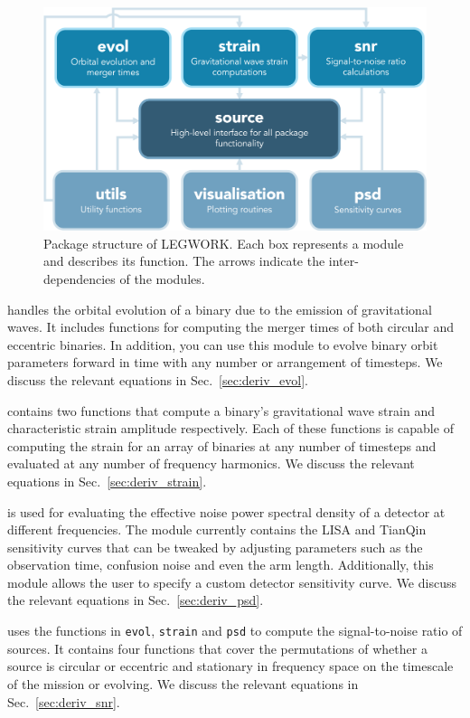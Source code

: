 \documentclass[twocolumn]{aastex631}
\newcommand{\lw}{LEGWORK}
\newcommand{\lwColour}{SeaGreen}
\newcommand{\lwModLink}[1]{\href{https://legwork.readthedocs.io/en/latest/modules.html\#module-legwork.#1}{\color{\lwColour}{\texttt{#1}}}}
\begin{document}
\begin{figure}
    \centering
    \includegraphics[width=\columnwidth]{static/package_overview.png}
    \caption{Package structure of \lw{}. Each box represents a module and describes its function. The arrows indicate the inter-dependencies of the modules.}
    \label{fig:package_overview}
\end{figure}

\lwModLink{evol} handles the orbital evolution of a binary due to the emission of gravitational waves. It includes functions for computing the merger times of both circular and eccentric binaries. In addition, you can use this module to evolve binary orbit parameters forward in time with any number or arrangement of timesteps. We discuss the relevant equations in Sec.~\ref{sec:deriv_evol}.

\lwModLink{strain} contains two functions that compute a binary's gravitational wave strain and characteristic strain amplitude respectively. Each of these functions is capable of computing the strain for an array of binaries at any number of timesteps and evaluated at any number of frequency harmonics. We discuss the relevant equations in Sec.~\ref{sec:deriv_strain}.

\lwModLink{psd} is used for evaluating the effective noise power spectral density of a detector at different frequencies. The module currently contains the LISA and TianQin sensitivity curves that can be tweaked by adjusting parameters such as the observation time, confusion noise and even the arm length. Additionally, this module allows the user to specify a custom detector sensitivity curve. We discuss the relevant equations in Sec.~\ref{sec:deriv_psd}.

\lwModLink{snr} uses the functions in \texttt{evol}, \texttt{strain} and \texttt{psd} to compute the signal-to-noise ratio of sources. It contains four functions that cover the permutations of whether a source is circular or eccentric and stationary in frequency space on the timescale of the mission or evolving. We discuss the relevant equations in Sec.~\ref{sec:deriv_snr}.
\end{document}
